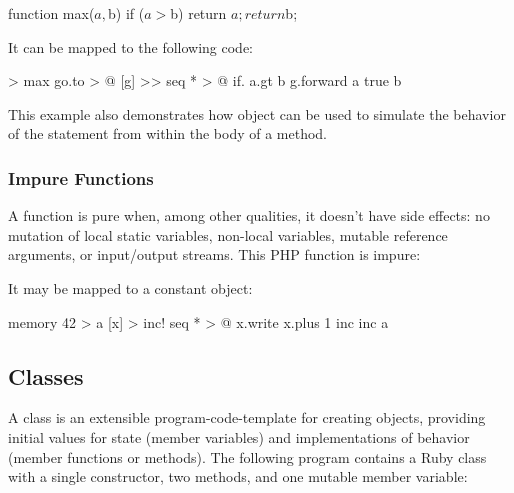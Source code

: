 \documentclass[sigplan,nonacm]{acmart}
\begin{document}
\begin{ffcode}
function max($a, $b) {
  if ($a > $b) return $a;
  return $b;
}
\end{ffcode}

It can be mapped to the following \eolang{} code:

\begin{ffcode}
[a b] > max
  go.to > @
    [g] >>
      seq * > @
        if.
          a.gt b
          g.forward a
          true
        b
\end{ffcode}

This example also demonstrates how  object can be used to simulate the behavior of the  statement from within the body of a method.

\subsubsection{Impure Functions}

A function is pure when, among other qualities, it doesn't have side effects:
no mutation of local static variables, non-local variables, mutable reference arguments,
or input/output streams. This PHP function is impure:


It may be mapped to a constant \eolang{} object:

\begin{ffcode}
memory 42 > a
[x] > inc!
  seq * > @
    x.write
      x.plus 1
inc
  inc a
\end{ffcode}

\subsection{Classes}
\label{sec:classes}

A class is an extensible program-code-template for creating objects, providing initial values for state (member variables) and implementations of behavior (member functions or methods). The following program contains a Ruby class with a single constructor, two methods, and one mutable member variable:

\end{document}
